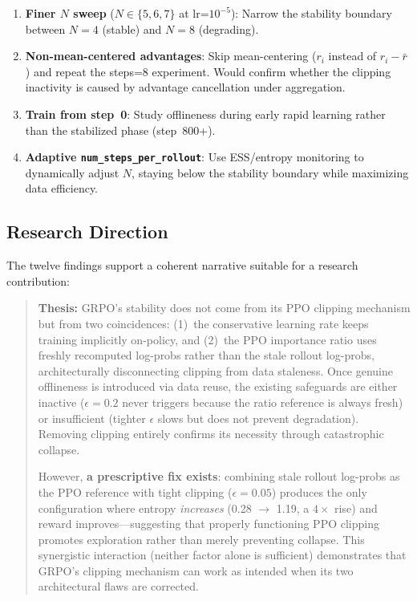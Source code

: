 \documentclass[11pt,a4paper]{article}
\begin{document}
\begin{enumerate}[leftmargin=*]
  \item \textbf{Finer $N$ sweep} ($N \in \{5, 6, 7\}$ at lr=$10^{-5}$):
    Narrow the stability boundary between $N = 4$ (stable) and $N = 8$
    (degrading).

  \item \textbf{Non-mean-centered advantages}: Skip mean-centering
    ($r_i$ instead of $r_i - \bar{r}$) and repeat the steps=8 experiment.
    Would confirm whether the clipping inactivity is caused by advantage
    cancellation under aggregation.

  \item \textbf{Train from step~0}: Study offlineness during early rapid
    learning rather than the stabilized phase (step~800+).

  \item \textbf{Adaptive \texttt{num\_steps\_per\_rollout}}: Use ESS/entropy
    monitoring to dynamically adjust $N$, staying below the stability boundary
    while maximizing data efficiency.
\end{enumerate}

\subsection{Research Direction}

The twelve findings support a coherent narrative suitable for a research
contribution:

\begin{quote}
\textbf{Thesis:} GRPO's stability does not come from its PPO clipping mechanism
but from two coincidences: (1)~the conservative learning rate keeps training
implicitly on-policy, and (2)~the PPO importance ratio uses freshly recomputed
log-probs rather than the stale rollout log-probs, architecturally disconnecting
clipping from data staleness. Once genuine offlineness is introduced via data
reuse, the existing safeguards are either inactive ($\epsilon = 0.2$ never
triggers because the ratio reference is always fresh) or insufficient (tighter
$\epsilon$ slows but does not prevent degradation). Removing clipping entirely
confirms its necessity through catastrophic collapse.

However, \textbf{a prescriptive fix exists}: combining stale rollout log-probs
as the PPO reference with tight clipping ($\epsilon = 0.05$) produces the only
configuration where entropy \emph{increases} (0.28 $\to$ 1.19, a $4\times$
rise) and reward improves---suggesting that properly functioning PPO clipping
promotes exploration rather than merely preventing collapse. This synergistic
interaction (neither factor alone is sufficient) demonstrates that GRPO's
clipping mechanism can work as intended when its two architectural flaws are
corrected.
\end{quote}
\end{document}
